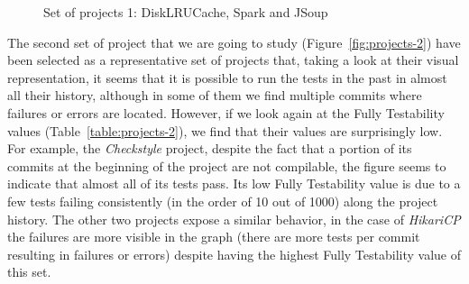 \begin{figure}[!htb]
\begin{minipage}{.5\textwidth}
        \label{fig:disklrucache}
    \end{minipage}%
    \caption{Set of projects 1: DiskLRUCache, Spark and JSoup}
    \label{fig:projects-1}
\end{figure}

\begin{table}[h!]
    \centering
    \caption{Metrics of set of projects 1: JSoup, Spark and DiskLRUCache}
    \label{table:projects-1}
\end{table}


The second set of project that we are going to study (Figure~\ref{fig:projects-2}) have been selected as a representative set of projects that, taking a look at their visual representation, it seems that it is possible to run the tests in the past in almost all their history, although in some of them we find multiple commits where failures or errors are located.
However, if we look again at the Fully Testability values (Table~\ref{table:projects-2}), we find that their values are surprisingly low. 
For example, the \textit{Checkstyle} project, despite the fact that a portion of its commits at the beginning of the project are not compilable, the figure seems to indicate that almost all of its tests pass. 
Its low Fully Testability value is due to a few tests failing consistently (in the order of 10 out of 1000) along the project history.
The other two projects expose a similar behavior, in the case of \textit{HikariCP} the failures are more visible in the graph (there are more tests per commit resulting in failures or errors) despite having the highest Fully Testability value of this set.

